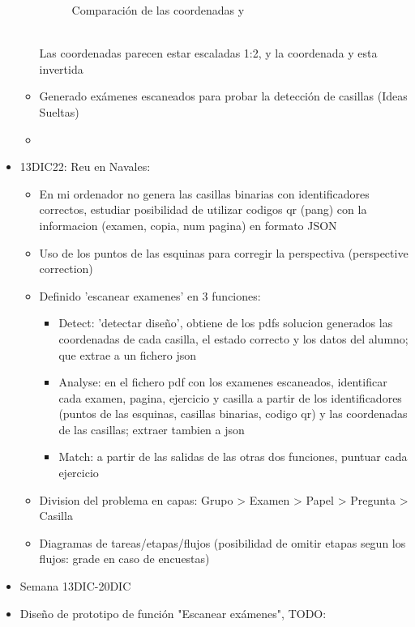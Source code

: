 \begin{itemize}
\begin{itemize}
\begin{figure}
\begin{minipage}{.5\textwidth}
                \caption{Comparación de las coordenadas y}
                \label{fig:graph_y}
            \end{minipage}
        \end{figure}
        \\ Las coordenadas parecen estar escaladas 1:2, y la coordenada y esta invertida
        \item Generado exámenes escaneados para probar la detección de casillas (Ideas Sueltas)
        \item 
    \end{itemize}
    \item 13DIC22: Reu en Navales:
    \begin{itemize}
        \item En mi ordenador no genera las casillas binarias con identificadores correctos, estudiar posibilidad de utilizar codigos qr (pang) con la informacion (examen, copia, num pagina) en formato JSON
        \item Uso de los puntos de las esquinas para corregir la perspectiva (perspective correction)
        \item Definido 'escanear examenes' en 3 funciones:
        \begin{itemize}
            \item Detect: 'detectar diseño', obtiene de los pdfs solucion generados las coordenadas de cada casilla, el estado correcto y los datos del alumno; que extrae a un fichero json
            \item Analyse: en el fichero pdf con los examenes escaneados, identificar cada examen, pagina, ejercicio y casilla a partir de los identificadores (puntos de las esquinas, casillas binarias, codigo qr) y las coordenadas de las casillas; extraer tambien a json
            \item Match: a partir de las salidas de las otras dos funciones, puntuar cada ejercicio
        \end{itemize}
        \item Division del problema en capas: Grupo > Examen > Papel > Pregunta > Casilla
        \item Diagramas de tareas/etapas/flujos (posibilidad de omitir etapas segun los flujos: grade en caso de encuestas)
    \end{itemize}
    \item Semana 13DIC-20DIC
    \item Diseño de prototipo de función "Escanear exámenes", TODO:
    \begin{itemize}

\end{itemize}
\end{itemize}
